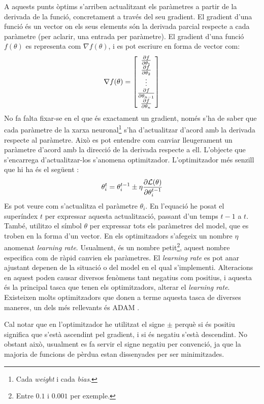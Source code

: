 A aquests punts òptims s'arriben actualitzant els paràmetres a partir de la derivada de la funció, concretament a través del seu gradient. El gradient d'una funció és un vector on els seus elements són la derivada parcial respecte a cada paràmetre (per aclarir, una entrada per paràmetre). El gradient d'una funció $f(\theta)$ es representa com $\nabla f(\theta)$, i es pot escriure en forma de vector com:
$$
\nabla f(\theta) = \begin{bmatrix}
	\pdv{f}{\theta_1} \\
	\pdv{f}{\theta_2} \\
	\vdots \\
	\pdv{f}{\theta_{n-1}} \\
	\pdv{f}{\theta_{n}}
\end{bmatrix}
$$
No fa falta fixar-se en el que és exactament un gradient, només s'ha de saber que cada paràmetre de la xarxa neuronal\footnote{Cada \textit{weight} i cada \textit{bias}.} s'ha d'actualitzar d'acord amb la derivada respecte al paràmetre. Això es pot entendre com canviar lleugerament un paràmetre d'acord amb la direcció de la derivada respecte a ell. L'objecte que s'encarrega d'actualitzar-los s'anomena optimitzador. L'optimitzador més senzill que hi ha és el següent \cite{3b1b}:
\begin{equation}
	\theta_{i}^t = \theta_{i}^{t-1} \pm \eta\pdv{\mathcal{L}(\theta)}{\theta_{i}^{t-1}}
	\label{eq:optimizator}
\end{equation}
Es pot veure com s'actualitza el paràmetre $\theta_i$. En l'equació he posat el superíndex $t$ per expressar aquesta actualització, passant d'un temps $t-1$ a $t$. També, utilitzo el símbol $\theta$ per expressar tots els paràmetres del model, que es troben en la forma d'un vector. En els optimitzadors s'afegeix un nombre $\eta$ anomenat \textit{learning rate}. Usualment, és un nombre petit\footnote{Entre $0.1$ i $0.001$ per exemple.}, aquest nombre especifica com de ràpid canvien els paràmetres. El \textit{learning rate} es pot anar ajustant depenen de la situació o del model en el qual s'implementi. Alteracions en aquest poden causar diversos fenòmens tant negatius com positius, i aquesta és la principal tasca que tenen els optimitzadors, alterar el \textit{learning rate}. Existeixen molts optimitzadors que donen a terme aquesta tasca de diverses maneres, un dels més rellevants és ADAM \cite{adam}. 

Cal notar que en l'optimitzador he utilitzat el signe $\pm$ perquè si és positiu significa que s'està ascendint pel gradient, i si és negatiu s'està descendint. No obstant això, usualment es fa servir el signe negatiu per convenció, ja que la majoria de funcions de pèrdua estan dissenyades per ser minimitzades. 

